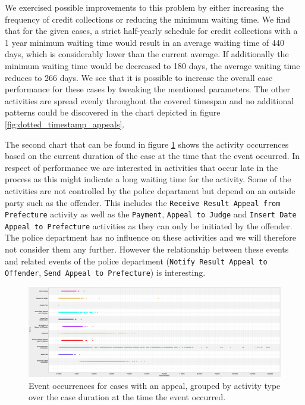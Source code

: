 \documentclass[12pt]{report}
\begin{document}
We exercised possible improvements to this problem by either increasing the frequency of credit collections or reducing the minimum waiting time. We find that for the given cases, a strict half-yearly schedule for credit collections with a 1 year minimum waiting time would result in an average waiting time of 440 days, which is considerably lower than the current average. If additionally the minimum waiting time would be decreased to 180 days, the average waiting time reduces to 266 days. We see that it is possible to increase the overall case performance for these cases by tweaking the mentioned parameters. The other activities are spread evenly throughout the covered timespan and no additional patterns could be discovered in the chart depicted in figure \ref{fig:dotted_timestamp_appeals}.

The second chart that can be found in figure \ref{fig:dotted_duration_appeals} shows the activity occurrences based on the current duration of the case at the time that the event occurred. In respect of performance we are interested in activities that occur late in the process as this might indicate a long waiting time for the activity. Some of the activities are not controlled by the police department but depend on an outside party such as the offender. This includes the \texttt{Receive Result Appeal from Prefecture} activity as well as the \texttt{Payment}, \texttt{Appeal to Judge} and \texttt{Insert Date Appeal to Prefecture} activities as they can only be initiated by the offender. The police department has no influence on these activities and we will therefore not consider them any further. However the relationship between these events and related events of the police department (\texttt{Notify Result Appeal to Offender}, \texttt{Send Appeal to Prefecture}) is interesting.
\begin{figure}[H]
  \centering
  \includegraphics[width=\textwidth]{figures/dotted_duration_appeals.png}
  \caption{Event occurrences for cases with an appeal, grouped by activity type over the case duration at the time the event occurred.}
  \label{fig:dotted_duration_appeals}
\end{figure}
\end{document}
